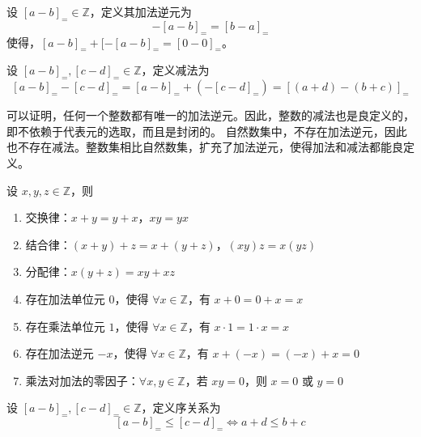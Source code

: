 \vspace{1em}

\begin{definition}
    设 $[a-b]_{=}\in\mathbb{Z}$，定义其加法逆元为
    \[
        -[a-b]_{=} = [b-a]_{=}
    \]
    使得，$[a-b]_{=} + [-[a-b]_{=} = [0-0]_{=}$。
\end{definition}

\begin{definition}
    设 $[a-b]_{=},[c-d]_{=}\in\mathbb{Z}$，定义减法为
    \[
        [a-b]_{=} - [c-d]_{=} = [a-b]_{=} + (-[c-d]_{=}) = [(a+d)-(b+c)]_{=}
    \]
\end{definition}

\begin{note}
    可以证明，任何一个整数都有唯一的加法逆元。因此，整数的减法也是良定义的，即不依赖于代表元的选取，而且是封闭的。
    自然数集中，不存在加法逆元，因此也不存在减法。整数集相比自然数集，扩充了加法逆元，使得加法和减法都能良定义。
\end{note}

\vspace{1em}

\begin{theorem}
    设 $x,y,z\in\mathbb{Z}$，则
    \begin{enumerate}
        \item 交换律：$x+y=y+x$，$xy=yx$
        \item 结合律：$(x+y)+z=x+(y+z)$，$(xy)z=x(yz)$
        \item 分配律：$x(y+z)=xy+xz$
        \item 存在加法单位元 $0$，使得 $\forall x\in\mathbb{Z}$，有 $x+0=0+x=x$
        \item 存在乘法单位元 $1$，使得 $\forall x\in\mathbb{Z}$，有 $x\cdot 1 = 1\cdot x = x$
        \item 存在加法逆元 $-x$，使得 $\forall x\in\mathbb{Z}$，有 $x+(-x)=(-x)+x=0$
        \item 乘法对加法的零因子：$\forall x,y\in\mathbb{Z}$，若 $xy=0$，则 $x=0$ 或 $y=0$
    \end{enumerate}
\end{theorem}

\vspace{1em}

\begin{definition}
    设 $[a-b]_{=},[c-d]_{=}\in\mathbb{Z}$，定义序关系为
    \[
        [a-b]_{=} \leq [c-d]_{=} \iff a+d \leq b+c
    \]    
\end{definition}

